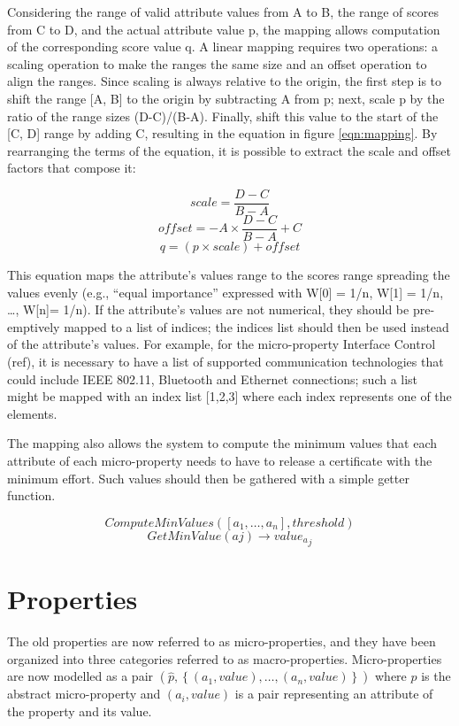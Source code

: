 Considering the range of valid attribute values from A to B, the range of scores from C to D, and the actual attribute value p, the mapping allows computation of the corresponding score value q.
A linear mapping requires two operations: a scaling operation to make the ranges the same size and an offset operation to align the ranges. Since scaling is always relative to the origin, the first step is to shift the range [A, B] to the origin by subtracting A from p; next, scale p by the ratio of the range sizes (D-C)/(B-A). Finally, shift this value to the start of the [C, D] range by adding C, resulting in the equation in figure \ref{eqn:mapping}. By rearranging the terms of the equation, it is possible to extract the scale and offset factors that compose it:

\[scale = \frac{D - C }{B - A}\]
\[offset = -A \times \frac{D - C}{B - A} + C\]
\[q = \left ( p \times scale \right ) + offset\]


This equation maps the attribute's values range to the scores range spreading the values evenly (e.g., “equal importance” expressed with W[0] = 1/n, W[1] = 1/n, \dots , W[n]= 1/n). If the attribute's values are not numerical, they should be pre-emptively mapped to a list of indices; the indices list should then be used instead of the attribute's values. For example, for the micro-property Interface Control (ref), it is necessary to have a list of supported communication technologies that could include IEEE 802.11, Bluetooth and Ethernet connections; such a list might be mapped with an index list [1,2,3] where each index represents one of the elements.

The mapping also allows the system to compute the minimum values that each attribute of each micro-property needs to have to release a certificate with the minimum effort. Such values should then be gathered with a simple getter function.

\[ComputeMinValues([a_1, \dots , a_n], threshold)\]
\[GetMinValue(aj) \rightarrow {value_a}_j\]

\section{Properties}
The old properties are now referred to as micro-properties, and they have been organized into three categories referred to as macro-properties. Micro-properties are now modelled as a pair \(\left (\hat{p}, \left \{  (a_1, value), \dots , (a_n, value)\right \} \right )\) 
where \(\hat{p}\) is the abstract micro-property and \(\left ( a_i ,value \right )\) is a pair representing an attribute of the property and its value.

